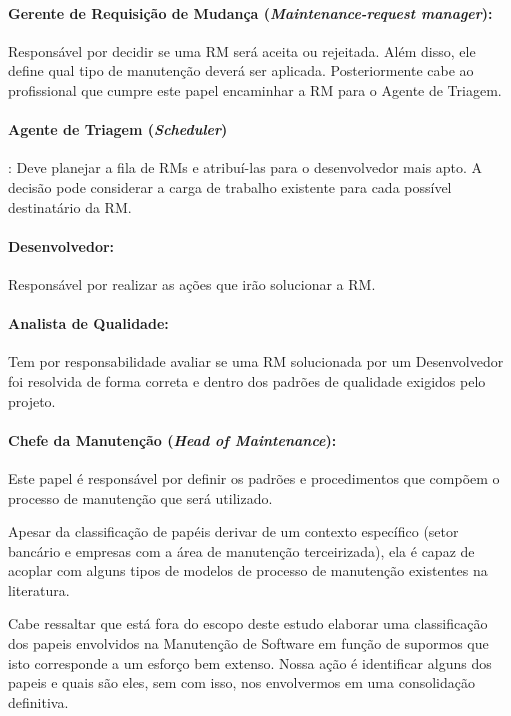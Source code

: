\paragraph{Gerente de Requisição de Mudança (\textit{Maintenance-request
        manager}):} Res\-pon\-sá\-vel por decidir se uma RM será aceita ou
rejeitada. Além disso, ele define qual tipo de manutenção deverá ser aplicada.
Posteriormente cabe ao profissional que cumpre este papel encaminhar a RM para
o Agente de Triagem.

\paragraph{Agente de Triagem (\textit{Scheduler})}:
Deve planejar a fila de RMs e atribuí-las para o desenvolvedor mais apto. A
decisão pode considerar a carga de trabalho existente para cada possível
destinatário da RM\@.

\paragraph{Desenvolvedor:}
Responsável por realizar as ações que irão solucionar a RM\@.

\paragraph{Analista de Qualidade:}
Tem por responsabilidade avaliar se uma RM solucionada por um Desenvolvedor foi
resolvida de forma correta e dentro dos padrões de qualidade exigidos pelo
projeto.

\paragraph{Chefe da Manutenção (\textit{Head of	Maintenance}):}
Este papel é responsável por definir os padrões e procedimentos que compõem o
processo de manutenção que será utilizado.

Apesar da classificação de papéis derivar de um contexto específico (setor
bancário e empresas com a área de manutenção terceirizada), ela é capaz de
acoplar com alguns tipos de modelos de processo de manutenção existentes na
literatura.

Cabe ressaltar que está fora do escopo deste estudo elaborar uma classificação
dos papeis envolvidos na Manutenção de Software em função de supormos que isto
corresponde a um esforço bem extenso. Nossa ação é identificar alguns dos
papeis e quais são eles, sem com isso, nos envolvermos em uma consolidação
definitiva.

